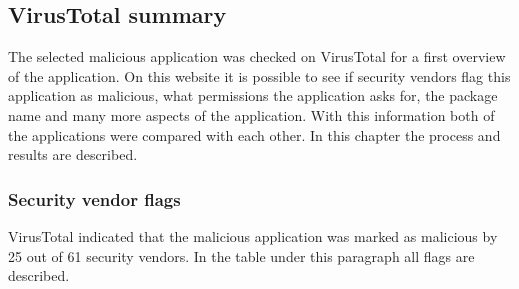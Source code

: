 \subsection{VirusTotal summary}
The selected malicious application was checked on VirusTotal for a first overview of the application. On this website it is possible to see if security vendors flag this application as malicious, what permissions the application asks for, the package name and many more aspects of the application. With this information both of the applications were compared with each other. In this chapter the process and results are described.

\subsubsection{Security vendor flags}
VirusTotal indicated that the malicious application was marked as malicious by 25 out of 61 security vendors. In the table under this paragraph all flags are described.

